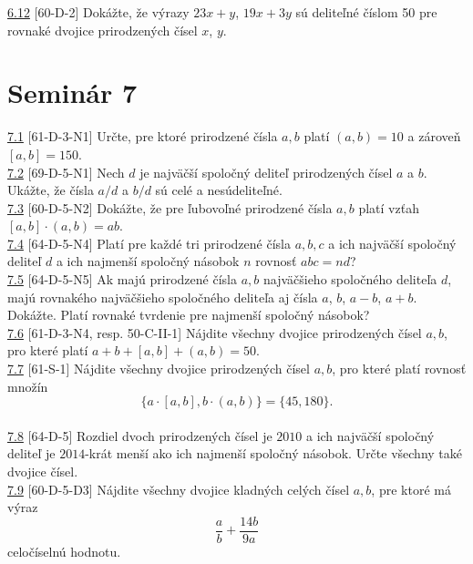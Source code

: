 \noindent \ul{6.12} [60-D-2]
Dokážte, že výrazy $23x + y$, $19x + 3y$ sú deliteľné číslom 50 pre rovnaké dvojice prirodzených čísel $x$, $y$.\\

\section*{Seminár 7}

\noindent \ul{7.1} [61-D-3-N1] Určte, pre ktoré prirodzené čísla $a, b$ platí $(a, b) = 10$ a zároveň  $[a, b] = 150$.\\

\noindent \ul{7.2} [69-D-5-N1] Nech $d$ je najväčší spoločný deliteľ prirodzených čísel $a$ a $b$. Ukážte, že čísla $a/d$ a $b/d$ sú celé a nesúdeliteľné.\\

\noindent \ul{7.3} [60-D-5-N2] Dokážte, že pre ľubovoľné prirodzené čísla $a, b$ platí vzťah $[a, b] \cdot (a, b) = ab$.\\

\noindent \ul{7.4} [64-D-5-N4] Platí pre každé tri prirodzené čísla $a, b, c$ a ich najväčší spoločný deliteľ $d$ a ich najmenší spoločný násobok $n$ rovnosť $abc = nd$?\\

\noindent \ul{7.5} [64-D-5-N5] Ak majú prirodzené čísla $a, b$ najväčšieho spoločného deliteľa $d$, majú rovnakého najväčšieho spoločného deliteľa aj čísla $a$, $b$, $a - b$, $a + b$. Dokážte. Platí rovnaké tvrdenie pre najmenší spoločný násobok?\\

\noindent \ul{7.6} [61-D-3-N4, resp. 50-C-II-1] Nájdite všechny dvojice prirodzených čísel $a, b$, pro které platí $a+b+[a, b]+(a, b) = 50$.\\

\noindent \ul{7.7} [61-S-1]
Nájdite všechny dvojice prirodzených čísel $a, b$, pro které platí rovnosť množín
$$\{a \cdot [a, b], b \cdot (a, b)\} = \{45, 180\}.$$\\

\noindent \ul{7.8} [64-D-5]
Rozdiel dvoch prirodzených čísel je $2010$ a ich najväčší spoločný deliteľ je $2014$-krát menší ako ich najmenší spoločný násobok. Určte všechny také dvojice čísel.\\

\noindent \ul{7.9} [60-D-5-D3] Nájdite všechny dvojice kladných celých čísel $a, b$, pre ktoré má výraz
$$\frac{a}{b}+\frac{14b}{9a}$$
celočíselnú hodnotu.\\

